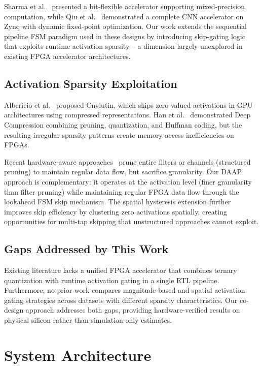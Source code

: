 \documentclass[conference]{IEEEtran}
\begin{document}
Sharma et al.~\cite{sharma2018} presented a bit-flexible accelerator supporting mixed-precision computation, while Qiu et al.~\cite{qiu2016} demonstrated a complete CNN accelerator on Zynq with dynamic fixed-point optimization. Our work extends the sequential pipeline FSM paradigm used in these designs by introducing skip-gating logic that exploits runtime activation sparsity -- a dimension largely unexplored in existing FPGA accelerator architectures.

\subsection{Activation Sparsity Exploitation}

Albericio et al.~\cite{albericio2016} proposed Cnvlutin, which skips zero-valued activations in GPU architectures using compressed representations. Han et al.~\cite{han2016} demonstrated Deep Compression combining pruning, quantization, and Huffman coding, but the resulting irregular sparsity patterns create memory access inefficiencies on FPGAs.

Recent hardware-aware approaches~\cite{zhang2022,chen2019} prune entire filters or channels (structured pruning) to maintain regular data flow, but sacrifice granularity. Our DAAP approach is complementary: it operates at the activation level (finer granularity than filter pruning) while maintaining regular FPGA data flow through the lookahead FSM skip mechanism. The spatial hysteresis extension further improves skip efficiency by clustering zero activations spatially, creating opportunities for multi-tap skipping that unstructured approaches cannot exploit.

\subsection{Gaps Addressed by This Work}

Existing literature lacks a unified FPGA accelerator that combines ternary quantization with runtime activation gating in a single RTL pipeline. Furthermore, no prior work compares magnitude-based and spatial activation gating strategies across datasets with different sparsity characteristics. Our co-design approach addresses both gaps, providing hardware-verified results on physical silicon rather than simulation-only estimates.


\section{System Architecture}
\label{sec:architecture}
\end{document}
